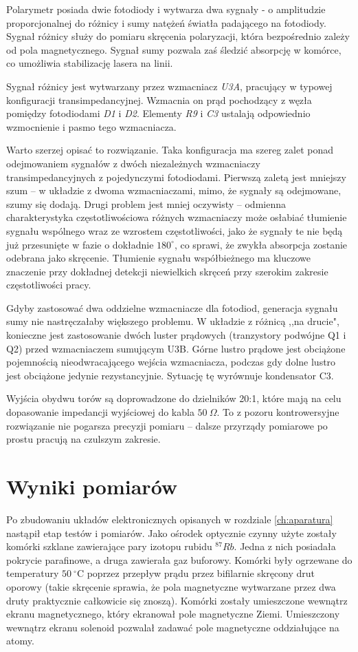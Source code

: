 \documentclass[a4paper,10pt,twoside]{report}
\begin{document}
Polarymetr posiada dwie fotodiody i wytwarza dwa sygnały - o amplitudzie proporcjonalnej do różnicy i sumy natężeń światła padającego na fotodiody.
Sygnał różnicy służy do pomiaru skręcenia polaryzacji, która bezpośrednio zależy od pola magnetycznego.  Sygnał sumy pozwala zaś śledzić absorpcję w komórce, co umożliwia stabilizację lasera na linii.

Sygnał różnicy jest wytwarzany przez wzmacniacz \textit{U3A}, pracujący w typowej konfiguracji transimpedancyjnej. Wzmacnia on prąd pochodzący z węzła pomiędzy fotodiodami \textit{D1} i \textit{D2}.
Elementy \textit{R9} i \textit{C3} ustalają odpowiednio wzmocnienie i pasmo tego wzmacniacza.

Warto szerzej opisać to rozwiązanie. Taka konfiguracja ma szereg zalet ponad odejmowaniem sygnałów z dwóch niezależnych wzmacniaczy transimpedancyjnych z pojedynczymi fotodiodami.
Pierwszą zaletą jest mniejszy szum -- w układzie z dwoma wzmacniaczami, mimo, że sygnały są odejmowane, szumy się dodają. Drugi problem jest mniej oczywisty -- odmienna charakterystyka częstotliwościowa różnych wzmacniaczy może osłabiać tłumienie sygnału wspólnego wraz ze wzrostem częstotliwości, jako że sygnały te nie będą już przesunięte w fazie o dokładnie $180^{\circ}$, co sprawi, że zwykła absorpcja zostanie odebrana jako skręcenie. Tłumienie sygnału współbieżnego ma kluczowe znaczenie przy dokładnej detekcji niewielkich skręceń przy szerokim zakresie częstotliwości pracy.

Gdyby zastosować dwa oddzielne wzmacniacze dla fotodiod, generacja sygnału sumy nie nastręczałaby większego problemu. W układzie z różnicą ,,na drucie", konieczne jest zastosowanie dwóch luster prądowych (tranzystory podwójne Q1 i Q2) przed wzmacniaczem sumującym U3B. Górne lustro prądowe jest obciążone pojemnością nieodwracającego wejścia wzmacniacza, podczas gdy dolne lustro jest obciążone jedynie rezystancyjnie. Sytuację tę wyrównuje kondensator C3. 

Wyjścia obydwu torów są doprowadzone do dzielników 20:1, które mają na celu dopasowanie impedancji wyjściowej do kabla $50~\Omega$. To z pozoru kontrowersyjne rozwiązanie nie pogarsza precyzji pomiaru -- dalsze przyrządy pomiarowe po prostu pracują na czulszym zakresie.


\chapter{Wyniki pomiarów}

Po zbudowaniu układów elektronicznych opisanych w rozdziale \ref{ch:aparatura} nastąpił etap testów i pomiarów. Jako ośrodek optycznie czynny użyte zostały komórki szklane zawierające pary izotopu rubidu ${}^87Rb$. Jedna z nich posiadała pokrycie parafinowe, a druga zawierała gaz buforowy. Komórki były ogrzewane do temperatury $50~{}^\circ$C poprzez przepływ prądu przez bifilarnie skręcony drut oporowy (takie skręcenie sprawia, że pola magnetyczne wytwarzane przez dwa druty praktycznie całkowicie się znoszą).
Komórki zostały umieszczone wewnątrz ekranu magnetycznego, który ekranował pole magnetyczne Ziemi. Umieszczony wewnątrz ekranu solenoid pozwalał zadawać pole magnetyczne oddziałujące na atomy.
\end{document}

